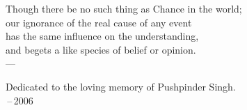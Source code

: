 \thispagestyle{empty}
{}

\vspace*{3cm}

%

%
%
%
%

\begin{center}
Though there be no such thing as Chance in the world; \\
our ignorance of the real cause of any event \\
has the same influence on the understanding, \\
and begets a like species of belief or opinion. \\ \medskip
    --- 
\end{center}

\medskip

\begin{center}
    Dedicated to the loving memory of Pushpinder Singh. \\ \,--\,2006
\end{center}
